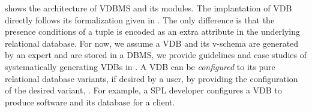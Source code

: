 %
 shows the architecture of VDBMS and its modules.
The implantation of VDB directly follows its formalization given in 
. The only difference is that the presence conditions
of a tuple is encoded as an extra attribute in the underlying relational
database. 
For now, we assume a VDB and its v-schema are generated by an 
expert and are stored in a DBMS, we provide guidelines and case studies of
systematically generating VDBs in 
. A VDB can be \emph{configured} to its pure relational 
database variants, if desired by a user, by providing the configuration
of the desired variant, .
For example, a SPL developer configures a VDB to produce 
software and its database for a client.

